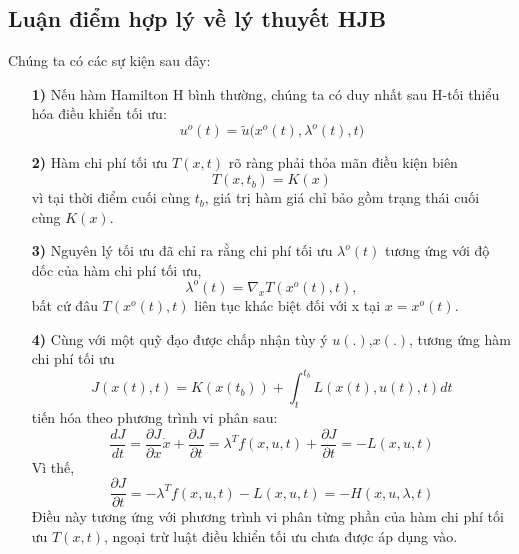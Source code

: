 \documentclass[12pt,a4paper]{report}
\begin{document}
		\subsection{Luận điểm hợp lý về lý thuyết HJB}
		Chúng ta có các sự kiện sau đây:
		\begin{enumerate}
			\item [\textbf{1)}] Nếu hàm Hamilton H bình thường, chúng ta có duy nhất sau
			H-tối thiểu hóa điều khiển tối ưu: $$u^o(t) = \tilde{u}\big(x^o(t), \lambda^o(t), t\big)$$ 
			\item [\textbf{2)}] Hàm chi phí tối ưu $T(x, t)$ rõ ràng phải thỏa mãn điều kiện biên $$T(x, t_b) = K(x)$$ vì tại thời điểm cuối cùng $t_b$, giá trị hàm giá chỉ bảo gồm trạng thái cuối cùng $K(x)$.\item[\textbf{3)}] Nguyên lý tối ưu đã chỉ ra rằng chi phí tối ưu $\lambda^o(t)$ tương ứng với độ dốc của hàm chi phí tối ưu, $$\lambda^o(t) = \nabla_xT(x^o(t),t), $$ bất cứ đâu $T(x^o(t), t)$ liên tục khác biệt đối với x tại $x = x^o(t)$.
			\item [\textbf{4)}] Cùng với một quỹ đạo được chấp nhận tùy ý $u(.)$,$x(.)$, tương ứng
			hàm chi phí tối ưu $$J(x(t), t) = K(x(t_b)) + \int_{t}^{t_b}L(x(t), u(t), t)dt$$ tiến hóa theo phương trình vi phân sau: $$\frac{dJ}{dt} = \frac{\partial J}{\partial x}\dot{x} + \frac{\partial J}{\partial t} = \lambda^Tf(x, u, t) + \frac{\partial J}{\partial t} = -L(x, u, t)$$ Vì thế, $$\frac{\partial J}{\partial t} = -\lambda^Tf(x, u, t) - L(x, u, t) = -H(x, u, \lambda, t)$$ Điều này tương ứng với phương trình vi phân từng phần của hàm chi phí tối ưu $T(x, t)$, ngoại trừ luật điều khiển tối ưu chưa được áp dụng vào. 
		\end{enumerate}
\end{document}
